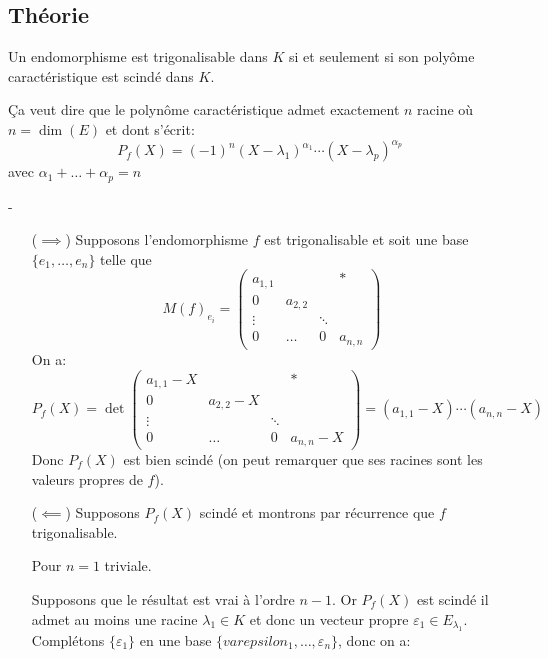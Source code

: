 \subsection{Théorie}
\begin{theorem}
    Un endomorphisme est trigonalisable dans $K$ si et seulement si son polyôme caractéristique est scindé dans  $K$. 
    \par 
    Ça veut dire que le polynôme caractéristique admet exactement $n$ racine où  $n = \dim(E)$ et dont s'écrit:
     \[
         P_f(X) = (-1)^n(X - \lambda_1)^{\alpha_1}\cdots(X - \lambda_p)^{\alpha_p}
    \] 
    avec $\alpha_1 + \ldots + \alpha_p = n$
\end{theorem}
\begin{preuve} -
   \begin{itemize}
       \item[($\implies$)] Supposons l'endomorphisme $f$ est trigonalisable et soit une base  $\{e_1, \ldots, e_n\}$ telle que
           \[
               M(f)_{e_i} = \begin{pmatrix} 
                   a_{1,1} &            & & *\\
                   0       & a_{2, 2}   & & \\
                   \vdots  &      & \ddots & \\
                   0        & \ldots    & 0 & a_{n, n}
               \end{pmatrix} 
           \] 
           On a:
           \[
            P_f(X) = \det \begin{pmatrix} 
                   a_{1,1} - X &            & & *\\
                   0       & a_{2, 2} - X   & & \\
                   \vdots  &      & \ddots & \\
                   0        & \ldots    & 0 & a_{n, n} - X
               \end{pmatrix} = (a_{1,1} - X) \cdots (a_{n,n} - X)
           \] 
           Donc $P_f(X)$ est bien scindé (on peut remarquer que ses racines sont les valeurs propres de $f$).
       \item[($\impliedby$)] Supposons $P_f(X)$ scindé et montrons par récurrence que  $f$ trigonalisable.
            \par
            Pour  $n=1$ triviale.
            \par
            Supposons que le résultat est vrai à l'ordre  $n-1$. Or  $P_f(X)$ est scindé il admet au moins une racine  $\lambda_1 \in K$ et donc un vecteur propre $\varepsilon_1 \in E_{\lambda_1}$. Complétons $\{\varepsilon_1\}$ en une base $\{varepsilon_1, \ldots, \varepsilon_n\}$, donc on a:

\end{itemize}
\end{preuve}
